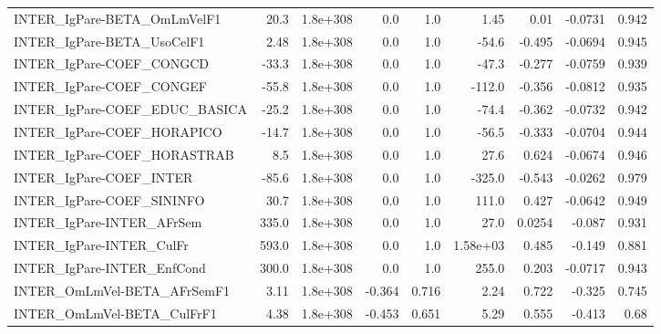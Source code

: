 \begin{tabular}{lrrrrrrrr}
INTER\_IgPare-BETA\_OmLmVelF1           &        20.3 &     1.8e+308 &     0.0 &      1.0 &       1.45 &        0.01 &      -0.0731 &         0.942 \\
INTER\_IgPare-BETA\_UsoCelF1            &        2.48 &     1.8e+308 &     0.0 &      1.0 &      -54.6 &      -0.495 &      -0.0694 &         0.945 \\
INTER\_IgPare-COEF\_CONGCD              &       -33.3 &     1.8e+308 &     0.0 &      1.0 &      -47.3 &      -0.277 &      -0.0759 &         0.939 \\
INTER\_IgPare-COEF\_CONGEF              &       -55.8 &     1.8e+308 &     0.0 &      1.0 &     -112.0 &      -0.356 &      -0.0812 &         0.935 \\
INTER\_IgPare-COEF\_EDUC\_BASICA         &       -25.2 &     1.8e+308 &     0.0 &      1.0 &      -74.4 &      -0.362 &      -0.0732 &         0.942 \\
INTER\_IgPare-COEF\_HORAPICO            &       -14.7 &     1.8e+308 &     0.0 &      1.0 &      -56.5 &      -0.333 &      -0.0704 &         0.944 \\
INTER\_IgPare-COEF\_HORASTRAB           &         8.5 &     1.8e+308 &     0.0 &      1.0 &       27.6 &       0.624 &      -0.0674 &         0.946 \\
INTER\_IgPare-COEF\_INTER               &       -85.6 &     1.8e+308 &     0.0 &      1.0 &     -325.0 &      -0.543 &      -0.0262 &         0.979 \\
INTER\_IgPare-COEF\_SININFO             &        30.7 &     1.8e+308 &     0.0 &      1.0 &      111.0 &       0.427 &      -0.0642 &         0.949 \\
INTER\_IgPare-INTER\_AFrSem             &       335.0 &     1.8e+308 &     0.0 &      1.0 &       27.0 &      0.0254 &       -0.087 &         0.931 \\
INTER\_IgPare-INTER\_CulFr              &       593.0 &     1.8e+308 &     0.0 &      1.0 &   1.58e+03 &       0.485 &       -0.149 &         0.881 \\
INTER\_IgPare-INTER\_EnfCond            &       300.0 &     1.8e+308 &     0.0 &      1.0 &      255.0 &       0.203 &      -0.0717 &         0.943 \\
INTER\_OmLmVel-BETA\_AFrSemF1           &        3.11 &     1.8e+308 &  -0.364 &    0.716 &       2.24 &       0.722 &       -0.325 &         0.745 \\
INTER\_OmLmVel-BETA\_CulFrF1            &        4.38 &     1.8e+308 &  -0.453 &    0.651 &       5.29 &       0.555 &       -0.413 &          0.68 \\

\end{tabular}
